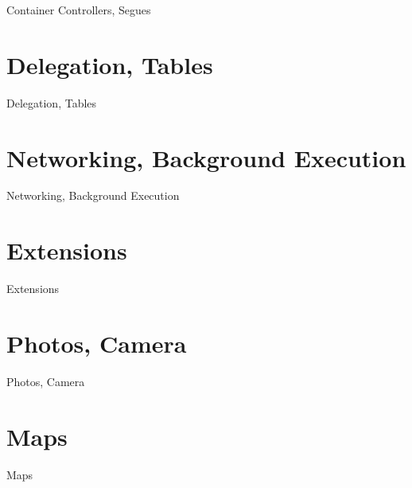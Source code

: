 \documentclass{beamer}
\begin{document}
\begin{frame}{Container Controllers, Segues}
\end{frame}

\section{Delegation, Tables}

\begin{frame}{Delegation, Tables}
\end{frame}

\section{Networking, Background Execution}

\begin{frame}{Networking, Background Execution}
\end{frame}

\section{Extensions}

\begin{frame}{Extensions}
\end{frame}

\section{Photos, Camera}

\begin{frame}{Photos, Camera}
\end{frame}

\section{Maps}

\begin{frame}{Maps}
\end{frame}
\end{document}
